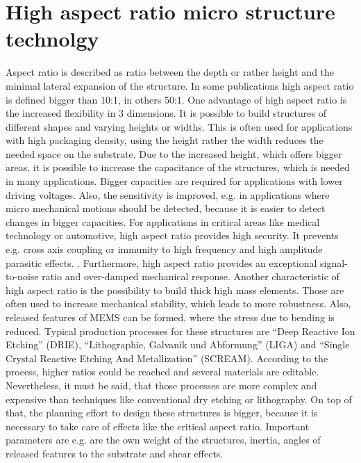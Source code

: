 \documentclass[a4paper,
  twoside, %
  headlines=2.1 %
  ]{scrartcl}
\begin{document}
\section{High aspect ratio micro structure technolgy}
Aspect ratio is described as ratio between the depth or rather height and the minimal lateral expansion of the structure. In some publications high aspect ratio is defined bigger than 10:1, in others 50:1. \cite{mcnie2000} One advantage of high aspect ratio is the increased flexibility in 3 dimensions. It is possible to build structures of different shapes and varying heights or widths. This is often used for applications with high packaging density, using the height rather the width reduces the needed space on the substrate.\cite{mcnie2000} Due to the increased height, which offers bigger areas, it is possible to increase the capacitance of the structures, which is needed in many applications. Bigger capacities are required for applications with lower driving voltages. Also, the sensitivity is improved, e.g. in applications where micro mechanical motions should be detected, because it is easier to detect changes in bigger capacities. \cite{pang2001} For applications in critical areas like medical technology or automotive, high aspect ratio provides high security. It prevents e.g. cross axis coupling or immunity to high frequency and high amplitude parasitic effects. \cite{mcnie2000,NXP2009}. Furthermore, high aspect ratio provides an exceptional signal-to-noise ratio and over-damped mechanical response. \cite{NXP2009} Another characteristic of high aspect ratio is the possibility to build thick high mass elements. Those are often used to increase mechanical stability, which leads to more robustness. Also, released features of MEMS can be formed, where the stress due to bending is reduced. \cite{mcnie2000, pang2001, hutchison2010} Typical production processes for these structures are \enquote{Deep Reactive Ion Etching} (DRIE), \enquote{Lithographie, Galvanik und Abformung} (LIGA) and \enquote{Single Crystal Reactive Etching And Metallization} (SCREAM). According to the process, higher ratios could be reached and several materials are editable. Nevertheless, it must be said, that those processes are more complex and expensive than techniques like conventional dry etching or lithography. On top of that, the planning effort to design these structures is bigger, because it is necessary to take care of effects like the critical aspect ratio. Important parameters are e.g. are the own weight of the structures, inertia, angles of released features to the substrate and shear effects.
\end{document}
